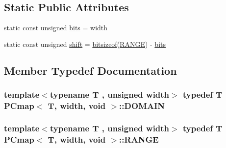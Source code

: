 \subsection*{Static Public Attributes}
\begin{DoxyCompactItemize}
\item 
static const unsigned \hyperlink{struct_p_cmap_3_01_t_00_01width_00_01void_01_4_ac0a988f7b861a5fb9cae1825ed582a14}{bits} = width
\item 
static const unsigned \hyperlink{struct_p_cmap_3_01_t_00_01width_00_01void_01_4_afbf36f52b1cf07b01bb37244cc7bc7ff}{shift} = \hyperlink{pcmap_8h_ac990acb81227ca09eb4071acd9a38969}{bitsizeof}(\hyperlink{struct_p_cmap_3_01_t_00_01width_00_01void_01_4_aa2de54b8c8232f2ab6907bc5ad5a98f0}{R\+A\+N\+G\+E}) -\/ \hyperlink{struct_p_cmap_3_01_t_00_01width_00_01void_01_4_ac0a988f7b861a5fb9cae1825ed582a14}{bits}
\end{DoxyCompactItemize}


\subsection{Member Typedef Documentation}
\hypertarget{struct_p_cmap_3_01_t_00_01width_00_01void_01_4_a2bacfdf01f29a1129b39cb4ba7e5325b}{}
\subsubsection[{D\+O\+M\+A\+I\+N}]{\setlength{\rightskip}{0pt plus 5cm}template$<$typename T , unsigned width$>$ typedef T {\bf P\+Cmap}$<$ T, width, void $>$\+::{\bf D\+O\+M\+A\+I\+N}}\label{struct_p_cmap_3_01_t_00_01width_00_01void_01_4_a2bacfdf01f29a1129b39cb4ba7e5325b}
\hypertarget{struct_p_cmap_3_01_t_00_01width_00_01void_01_4_aa2de54b8c8232f2ab6907bc5ad5a98f0}{}
\subsubsection[{R\+A\+N\+G\+E}]{\setlength{\rightskip}{0pt plus 5cm}template$<$typename T , unsigned width$>$ typedef T {\bf P\+Cmap}$<$ T, width, void $>$\+::{\bf R\+A\+N\+G\+E}}\label{struct_p_cmap_3_01_t_00_01width_00_01void_01_4_aa2de54b8c8232f2ab6907bc5ad5a98f0}


